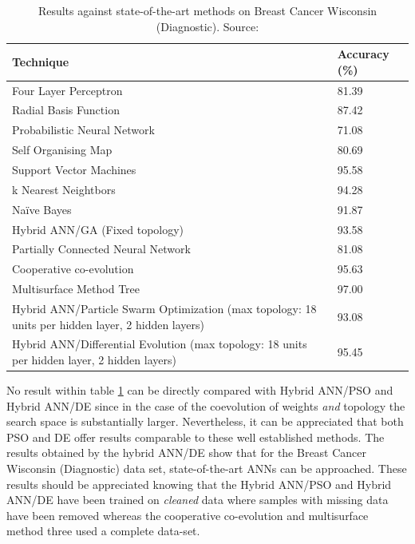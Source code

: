 \documentclass[a4paper,12pt, oneside]{memoir}
\begin{document}
\begin{table}[h]
  \begin{center}
    \begin{tabular}{ | p{15cm} | l |}
    \hline
    Technique & Accuracy (\%) \\ \hline
    Four Layer Perceptron                 &   81.39  \\ \hline
    Radial Basis Function                 &   87.42  \\ \hline
    Probabilistic Neural Network          &   71.08  \\ \hline
    Self Organising Map                   &   80.69  \\ \hline
    Support Vector Machines               &   95.58  \\ \hline
    k Nearest Neightbors                  &   94.28  \\ \hline
    Naïve Bayes                           &   91.87  \\ \hline
    Hybrid ANN/GA (Fixed topology)        &   93.58  \\ \hline
    Partially Connected Neural Network    &   81.08  \\ \hline 
    \hline
    \hline
    Cooperative co-evolution              &   95.63  \\ \hline
    Multisurface Method Tree              &   97.00  \\ \hline
    \hline
    \hline
    Hybrid ANN/Particle Swarm Optimization  (max topology: 18 units per hidden layer, 2 hidden layers)               &   93.08  \\ \hline
    Hybrid ANN/Differential Evolution       (max topology: 18 units per hidden layer, 2 hidden layers)               &   95.45  \\
    \hline
    \end{tabular}
  \end{center}
  \vspace{-10pt}
  \caption{Results against state-of-the-art methods on Breast Cancer Wisconsin (Diagnostic). Source: \cite{Gorunescu-2014}}
  \label{table:state-of-the-art-comparison}
\end{table}

No result within table \ref{table:state-of-the-art-comparison} can be directly compared with Hybrid ANN/PSO and Hybrid ANN/DE since in the case of the coevolution of weights \textit{and} topology the search space is substantially larger. Nevertheless, it can be appreciated that both PSO and DE offer results comparable to these well established methods. The results obtained by the hybrid ANN/DE show that for the Breast Cancer Wisconsin (Diagnostic) data set, state-of-the-art ANNs can be approached. These results should be appreciated knowing that the Hybrid ANN/PSO and Hybrid ANN/DE have been trained on \textit{cleaned} data where samples with missing data have been removed whereas the cooperative co-evolution and multisurface method three used a complete data-set.
\end{document}
